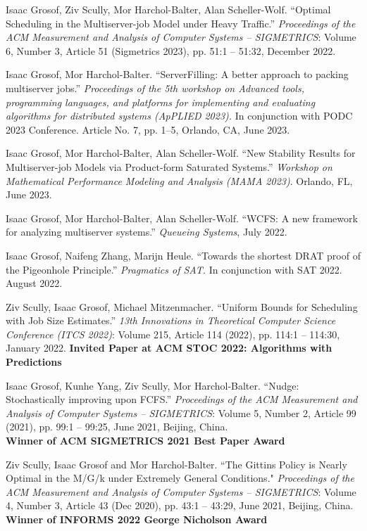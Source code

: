 \documentclass{res}
\begin{document}
\begin{resume}
    Isaac Grosof, Ziv Scully, Mor Harchol-Balter, Alan Scheller-Wolf.
    ``Optimal Scheduling in the Multiserver-job Model under Heavy Traffic.''
     \textit{Proceedings of the ACM Measurement and Analysis of Computer Systems -- SIGMETRICS}:
     Volume 6, Number 3, Article 51 (Sigmetrics 2023),
     pp. 51:1 -- 51:32, December 2022.

    Isaac Grosof, Mor Harchol-Balter. ``ServerFilling: A better approach to packing multiserver jobs.''
    \textit{Proceedings of the 5th workshop on Advanced tools, programming languages, and platforms for implementing and evaluating algorithms for distributed systems (ApPLIED 2023).}
    In conjunction with PODC 2023 Conference. Article No. 7, pp. 1--5, Orlando, CA, June 2023.

    Isaac Grosof, Mor Harchol-Balter, Alan Scheller-Wolf. ``New Stability Results for Multiserver-job Models via Product-form Saturated Systems.'' \textit{Workshop on Mathematical Performance Modeling and Analysis (MAMA 2023)}. Orlando, FL, June 2023.

    Isaac Grosof, Mor Harchol-Balter, Alan Scheller-Wolf.
    ``WCFS: A new framework for analyzing multiserver systems.''
    \textit{Queueing Systems}, July 2022.

    Isaac Grosof, Naifeng Zhang, Marijn Heule.
    ``Towards the shortest DRAT proof of the Pigeonhole Principle.''
    \textit{Pragmatics of SAT.} In conjunction with SAT 2022. August 2022.

    Ziv Scully, Isaac Grosof, Michael Mitzenmacher.
    ``Uniform Bounds for Scheduling with Job Size Estimates.'' 
    \textit{13th Innovations in Theoretical Computer Science Conference (ITCS 2022)}:
    Volume 215, Article 114 (2022), pp. 114:1 -- 114:30, January 2022.
    \textbf{Invited Paper at ACM STOC 2022: Algorithms with Predictions}

    Isaac Grosof, Kunhe Yang, Ziv Scully, Mor Harchol-Balter.
    ``Nudge: Stochastically improving upon FCFS.''
    \textit{Proceedings of the ACM Measurement and Analysis of Computer Systems -- SIGMETRICS}: Volume 5, Number 2, Article 99 (2021), pp. 99:1 -- 99:25, June 2021, Beijing, China.\\
    \textbf{Winner of ACM SIGMETRICS 2021 Best Paper Award}

    Ziv Scully, Isaac Grosof and Mor Harchol-Balter.
    ``The Gittins Policy is Nearly Optimal in the M/G/k under Extremely General Conditions."
    \textit{Proceedings of the ACM Measurement and Analysis of Computer Systems -- SIGMETRICS}: Volume 4, Number 3, Article 43 (Dec 2020), pp. 43:1 -- 43:29, June 2021, Beijing, China. \\
    \textbf{Winner of INFORMS 2022 George Nicholson Award}


\end{resume}
\end{document}

